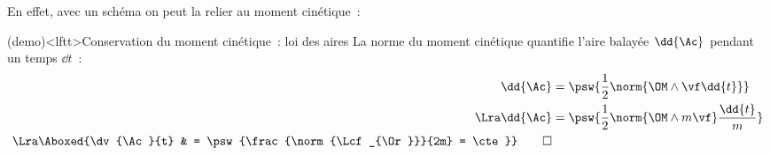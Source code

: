 \documentclass[../../main/main.tex]{subfiles}
\begin{document}
En effet, avec un schéma on peut la relier au moment cinétique~:
\begin{tcb*}[sidebyside](demo)<lftt>{Conservation du moment cinétique~: loi des
  aires}
	La norme du moment cinétique quantifie l'aire balayée $\dd{\Ac}$ pendant un
	temps $\dd{t}$~:
	\begin{align*}
		\dd{\Ac}            & = \psw{\frac{1}{2}\norm{\OM \wedge \vf \dd{t}}}
		\\\Lra
		\dd{\Ac}            & = \psw{\frac{1}{2}\norm{\OM \wedge m \vf} \frac{\dd{t}}{m}}
		\\\Lra
		\Aboxed{\dv{\Ac}{t} & = \psw{\frac{\norm{\Lcf_{\Or}}}{2m} = \cte}}
		\qed
	\end{align*}
	\tcblower
	\begin{center}
\end{center}
\end{tcb*}
\end{document}
